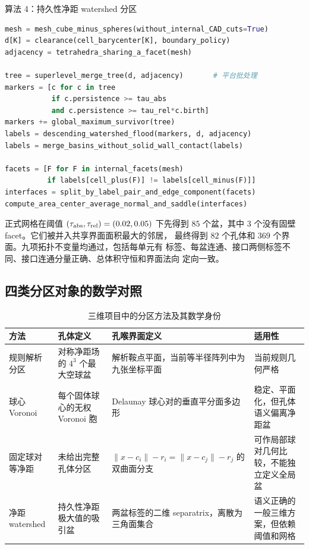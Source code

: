 \documentclass[UTF8,zihao=-4]{ctexart}
\begin{document}
\begin{algobox}{算法 4：持久性净距 watershed 分区}
\begin{lstlisting}[style=compactcode,language=Python]
mesh = mesh_cube_minus_spheres(without_internal_CAD_cuts=True)
d[K] = clearance(cell_barycenter[K], boundary_policy)
adjacency = tetrahedra_sharing_a_facet(mesh)

tree = superlevel_merge_tree(d, adjacency)       # 平台批处理
markers = [c for c in tree
           if c.persistence >= tau_abs
           and c.persistence >= tau_rel*c.birth]
markers += global_maximum_survivor(tree)
labels = descending_watershed_flood(markers, d, adjacency)
labels = merge_basins_without_solid_wall_contact(labels)

facets = [F for F in internal_facets(mesh)
          if labels[cell_plus(F)] != labels[cell_minus(F)]]
interfaces = split_by_label_pair_and_edge_component(facets)
compute_area_center_average_normal_and_saddle(interfaces)
\end{lstlisting}
\end{algobox}

正式网格在阈值 $(\tau_{\rm abs},\tau_{\rm rel})=(0.02,0.05)$ 下先得到
$85$ 个盆，其中 $3$ 个没有固壁 facet。它们被并入共享界面面积最大的邻居，
最终得到 $82$ 个孔体和 $369$ 个界面。九项拓扑不变量均通过，包括每单元有
标签、每盆连通、接口两侧标签不同、接口连通分量正确、总体积守恒和界面法向
定向一致。

\subsection{四类分区对象的数学对照}

\begin{table}[htbp]
\centering
\caption{三维项目中的分区方法及其数学身份}
\label{tab:partition-summary}
\small
\begin{tabularx}{\textwidth}{p{2.6cm}p{3.3cm}Xp{2.5cm}}
\toprule
方法 & 孔体定义 & 孔喉界面定义 & 适用性\\
\midrule
规则解析分区 & 对称净距场的 $4^3$ 个最大空球盆
& 解析鞍点平面，当前等半径阵列中为九张坐标平面
& 当前规则几何严格\\
球心 Voronoi & 每个固体球心的无权 Voronoi 胞
& Delaunay 球心对的垂直平分面多边形
& 稳定、平面化，但孔体语义偏离净距盆\\
固定球对等净距 & 未给出完整孔体分区
& $\|x-c_i\|-r_i=\|x-c_j\|-r_j$ 的双曲面分支
& 可作局部球对几何比较，不能独立定义全局盆\\
净距 watershed & 持久性净距极大值的吸引盆
& 两盆标签的二维 separatrix，离散为三角面集合
& 语义正确的一般三维方案，但依赖阈值和网格\\
\bottomrule
\end{tabularx}
\end{table}
\end{document}
